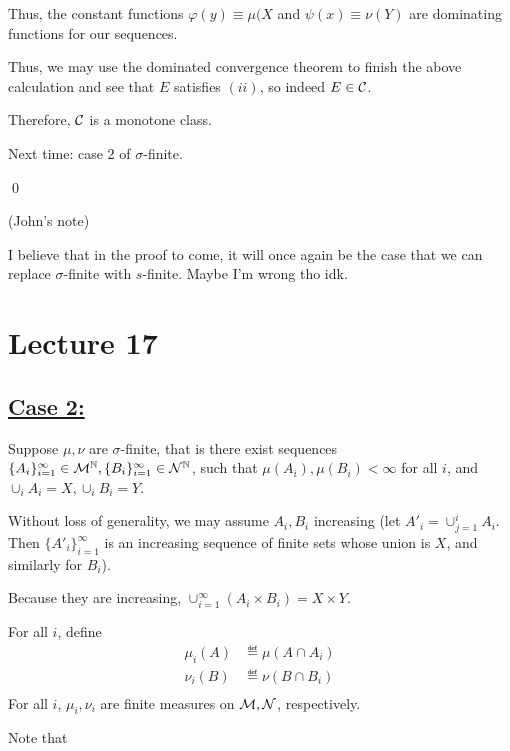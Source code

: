 \documentclass[x11names,reqno,14pt]{extarticle}
\newcommand*{\oo}{\infty}
\newcommand{\seq}[1]{_{#1 = 1}^\oo}
\begin{document}
Thus, the constant functions $\varphi(y) \equiv \mu(X$ and $\psi(x) \equiv \nu(Y)$ are dominating functions for our sequences. 

Thus, we may use the dominated convergence theorem to finish the above calculation and see that $E$ satisfies $(ii)$, so indeed $E \in \mathcal{C}$. 

Therefore, $\mathcal{C}$ is a monotone class. 

Next time: case 2 of $\sigma$-finite. 

\qed

\rem (John's note)

I believe that in the proof to come, it will once again be the case that we can replace $\sigma$-finite with $s$-finite. Maybe I'm wrong tho idk.

\section*{Lecture 17}

\subsection*{\underline{Case 2:}}

Suppose $\mu,\nu$ are $\sigma$-finite, that is there exist sequences $\{A_i\}\seq{i}\in\mc{M}^\N, \{B_i\}\seq{i}\in\mc{N}^\N$, such that $\mu(A_i), \mu(B_i) < \oo$ for all $i$, and $\cup_iA_i = X, \cup_iB_i = Y$. 

Without loss of generality, we may assume $A_i, B_i$ increasing (let $A'_i = \cup_{j=1}^i A_i$. Then $\{A'_i\}\seq{i}$ is an increasing sequence of finite sets whose union is $X$, and similarly for $B_i$). 

Because they are increasing, $\cup\seq{i}(A_i\times B_i) = X\times Y$. 

For all $i$, define
\begin{align*}
\mu_i(A) & \eqdef \mu(A\cap A_i) \\
\nu_i(B) & \eqdef \nu(B\cap B_i) \\
\end{align*}
For all $i$, $\mu_i,\nu_i$ are finite measures on $\mathcal{M}, \mathcal{N}$, respectively. 

Note that
\begin{center}
\end{center}
\end{document}
